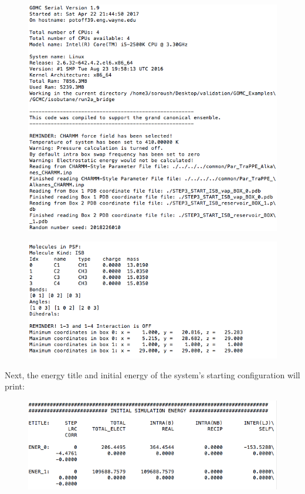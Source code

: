 \begin{figure}[H]
\includegraphics[scale=1]{images/out1}
\end{figure}
\begin{figure}[H]
\includegraphics[scale=1]{images/out2}
\end{figure}
\newpage
Next, the energy title and initial energy of the system's starting configuration will print:\\
\begin{figure}[H]
\includegraphics[scale=1]{images/out3}
\end{figure}
